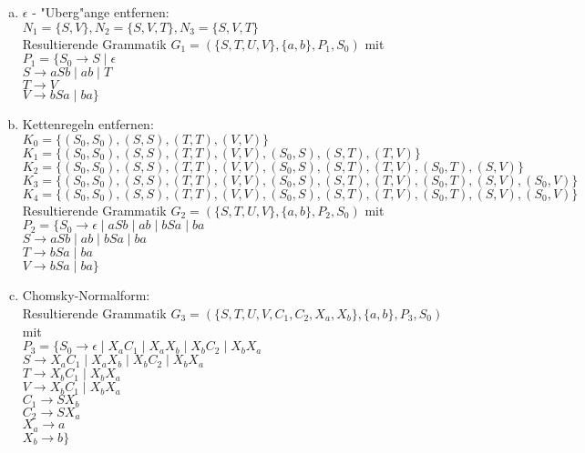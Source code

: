 \documentclass[a4paper,12pt]{article}
\begin{document}
\begin{enumerate}[(a)]
    \item 
    $ \epsilon $ - "Uberg"ange entfernen: \\
    $ N_1 = \{S, V\}, N_2 = \{S, V, T\}, N_3 = \{S, V, T\} $ \\

    Resultierende Grammatik $ G_1 = (\{S, T, U ,V\}, \{a, b\}, P_1, S_0) $ mit \\
    $ P_1 = \{ S_0 \rightarrow S \mid \epsilon $ \\
    $ S \rightarrow aSb \mid ab \mid T $ \\
    $ T \rightarrow V $ \\
    $ V \rightarrow bSa \mid ba \} $

    \item 
    Kettenregeln entfernen: \\
    $ K_0 = \{(S_0, S_0), (S, S), (T, T), (V, V)\} $ \\
    $ K_1 = \{(S_0, S_0), (S, S), (T, T), (V, V), (S_0, S), (S, T), (T, V)\} $ \\
    $ K_2 = \{(S_0, S_0), (S, S), (T, T), (V, V), (S_0, S), (S, T), (T, V), (S_0, T), (S, V)\} $ \\
    $ K_3 = \{(S_0, S_0), (S, S), (T, T), (V, V), (S_0, S), (S, T), (T, V), (S_0, T), (S, V), (S_0, V)\} $ \\
    $ K_4 = \{(S_0, S_0), (S, S), (T, T), (V, V), (S_0, S), (S, T), (T, V), (S_0, T), (S, V), (S_0, V)\} $ \\

    Resultierende Grammatik $ G_2  = (\{S, T, U ,V\}, \{a, b\}, P_2, S_0) $ mit \\
    $ P_2 = \{ S_0 \rightarrow \epsilon \mid aSb \mid ab \mid bSa \mid ba $ \\
    $ S \rightarrow aSb \mid ab \mid bSa \mid ba $ \\
    $ T \rightarrow bSa \mid ba $ \\
    $ V \rightarrow bSa \mid ba \}$

    \item 
    Chomsky-Normalform: \\
    Resultierende Grammatik $ G_3 = (\{S, T, U, V, C_1, C_2, X_a, X_b\}, \{a, b\}, P_3, S_0) $ mit \\
    $ P_3 = \{ S_0 \rightarrow \epsilon \mid X_a C_1 \mid X_a X_b \mid X_b C_2 \mid X_b X_a $ \\
    $ S \rightarrow X_a C_1 \mid X_a X_b \mid X_b C_2 \mid X_b X_a $ \\
    $ T \rightarrow X_b C_1 \mid X_b X_a $ \\
    $ V \rightarrow X_b C_1 \mid X_b X_a $ \\
    $ C_1 \rightarrow S X_b $ \\
    $ C_2 \rightarrow S X_a $ \\
    $ X_a \rightarrow a $ \\
    $ X_b \rightarrow b \} $

\end{enumerate}
\end{document}
